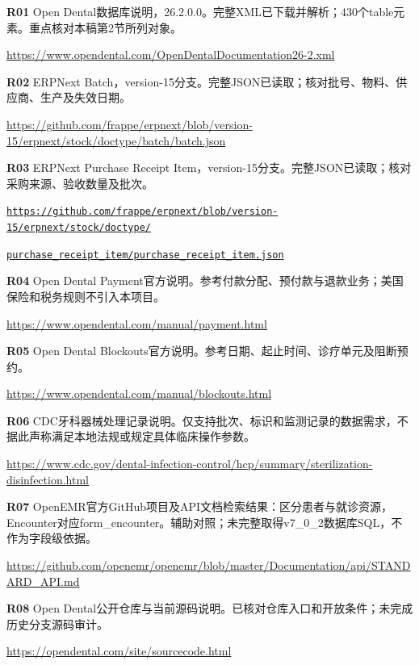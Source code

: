 \documentclass[UTF8,a4paper,zihao=-4,fontset=none]{ctexart}
\begin{document}
\noindent\textbf{R01} Open Dental数据库说明，26.2.0.0。完整XML已下载并解析；430个table元素。重点核对本稿第2节所列对象。\par{\footnotesize\noindent \url{https://www.opendental.com/OpenDentalDocumentation26-2.xml}}\par\medskip
\noindent\textbf{R02} ERPNext Batch，version-15分支。完整JSON已读取；核对批号、物料、供应商、生产及失效日期。\par{\footnotesize\noindent \url{https://github.com/frappe/erpnext/blob/version-15/erpnext/stock/doctype/batch/batch.json}}\par\medskip
\noindent\textbf{R03} ERPNext Purchase Receipt Item，version-15分支。完整JSON已读取；核对采购来源、验收数量及批次。\par{\footnotesize\noindent \href{https://github.com/frappe/erpnext/blob/version-15/erpnext/stock/doctype/purchase_receipt_item/purchase_receipt_item.json}{\nolinkurl{https://github.com/frappe/erpnext/blob/version-15/erpnext/stock/doctype/}}\par\noindent\href{https://github.com/frappe/erpnext/blob/version-15/erpnext/stock/doctype/purchase_receipt_item/purchase_receipt_item.json}{\nolinkurl{purchase_receipt_item/purchase_receipt_item.json}}}\par\medskip
\noindent\textbf{R04} Open Dental Payment官方说明。参考付款分配、预付款与退款业务；美国保险和税务规则不引入本项目。\par{\footnotesize\noindent \url{https://www.opendental.com/manual/payment.html}}\par\medskip
\noindent\textbf{R05} Open Dental Blockouts官方说明。参考日期、起止时间、诊疗单元及阻断预约。\par{\footnotesize\noindent \url{https://www.opendental.com/manual/blockouts.html}}\par\medskip
\noindent\textbf{R06} CDC牙科器械处理记录说明。仅支持批次、标识和监测记录的数据需求，不据此声称满足本地法规或规定具体临床操作参数。\par{\footnotesize\noindent \url{https://www.cdc.gov/dental-infection-control/hcp/summary/sterilization-disinfection.html}}\par\medskip
\noindent\textbf{R07} OpenEMR官方GitHub项目及API文档检索结果：区分患者与就诊资源，Encounter对应form\_\allowbreak{}encounter。辅助对照；未完整取得v7\_\allowbreak{}0\_\allowbreak{}2数据库SQL，不作为字段级依据。\par{\footnotesize\noindent \url{https://github.com/openemr/openemr/blob/master/Documentation/api/STANDARD_API.md}}\par\medskip
\noindent\textbf{R08} Open Dental公开仓库与当前源码说明。已核对仓库入口和开放条件；未完成历史分支源码审计。\par{\footnotesize\noindent \url{https://opendental.com/site/sourcecode.html}}\par\medskip
\end{document}
